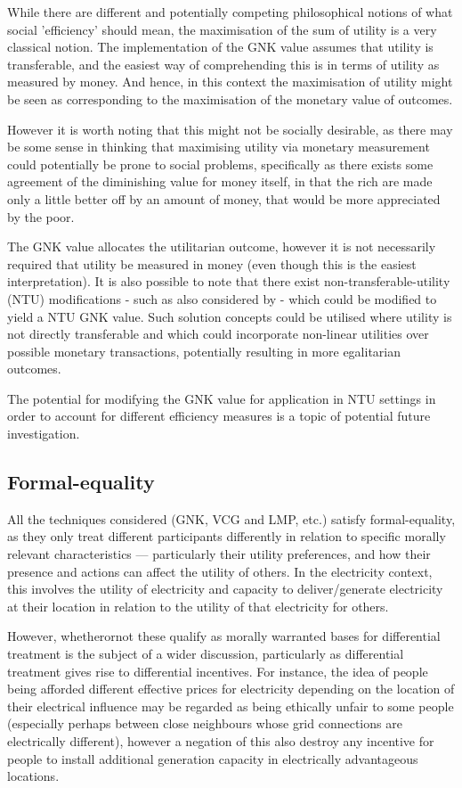 While there are different and potentially competing philosophical notions of what social 'efficiency' should mean, the maximisation of the sum of utility is a very classical notion.
The implementation of the GNK value assumes that utility is transferable, and the easiest way of comprehending this is in terms of utility as measured by money. And hence, in this context the maximisation of utility might be seen as corresponding to the maximisation of the monetary value of outcomes.

However it is worth noting that this might not be socially desirable, as there may be some sense in thinking that maximising utility via monetary measurement could potentially be prone to social problems, specifically as there exists some agreement of the diminishing value for money itself, in that the rich are made only a little better off by an amount of money, that would be more appreciated by the poor.

The GNK value allocates the utilitarian outcome, however it is not necessarily required that utility be measured in money (even though this is the easiest interpretation).
It is also possible to note that there exist non-transferable-utility (NTU) modifications - such as also considered by \cite{value1} - which could be modified to yield a NTU GNK value.
Such solution concepts could be utilised where utility is not directly transferable and which could incorporate non-linear utilities over possible monetary transactions, potentially resulting in more egalitarian outcomes.

The potential for modifying the GNK value for application in NTU settings in order to account for different efficiency measures is a topic of potential future investigation.

\subsection{Formal-equality}

All the techniques considered (GNK, VCG and LMP, etc.) satisfy formal-equality, as they only treat different participants differently in relation to specific morally relevant characteristics --- particularly their utility preferences, and how their presence and actions can affect the utility of others.
In the electricity context, this involves the utility of electricity and capacity to deliver/generate electricity at their location in relation to the utility of that electricity for others.

However, whetherornot these qualify as morally warranted bases for differential treatment is the subject of a wider discussion, particularly as differential treatment gives rise to differential incentives.
For instance, the idea of people being afforded different effective prices for electricity depending on the location of their electrical influence may be regarded as being ethically unfair to some people (especially perhaps between close neighbours whose grid connections are electrically different), however a negation of this also destroy any incentive for people to install additional generation capacity in electrically advantageous locations.

